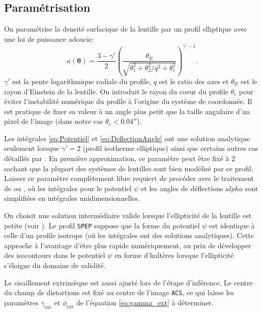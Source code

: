 \documentclass[times,10pt,twocolumn]{article}
\begin{document}
\subsection{Paramétrisation}
On paramétrise la densité surfacique de la lentille par un profil elliptique avec une loi 
de puissance adoucie:
\begin{equation}\label{eq:Kappa} 
        \kappa(\boldsymbol{\theta}) = \frac{3 - \gamma'}{2} 
        \left( 
                \frac{\theta_E}{\sqrt{\theta_1^2 + \theta_2^2/q^2 + \theta_c^2}}
\right)^{\gamma'- 1}. 
\end{equation} 
$\gamma'$ est la pente logarithmique radiale du profile, $q$ est le ratio des axes 
et $\theta_E$ est le rayon d'Einstein de la lentille. On introduit le rayon du coeur du profile 
$\theta_c$ pour éviter l'instabilité numérique du profile à l'origine du système de coordonnée. 
Il est pratique de fixer sa valeur à un angle plus petit que la taille angulaire d'un 
pixel de l'image (dans notre cas $\theta_c < 0.04''$). \par


Les intégrales \eqref{eq:Potentiel} et \eqref{eq:DeflectionAngle} ont une solution analytique 
seulement lorsque $\gamma'= 2$ (profil isotherme elliptique) ainsi que certains autres cas 
détaillés par \citet{Keeton2001}. En première approximation, ce paramètre peut être fixé 
à $2$ sachant que la plupart des systèmes de lentilles sont bien modélisé par ce profil. 
Laisser ce paramètre complètement libre requiert de procéder avec le traitement de 
\citet{Barkana1998} ou \citet{Tessore2015}, où les intégrales pour le potentiel $\psi$ 
et les angles de déflections $alpha$ 
sont simplifiées en intégrales unidimensionnelles. \par

On choisit une solution intermédiaire valide lorsque l'ellipticité de la lentille est 
petite (voir \citet{Barkana1998}). Le profil \texttt{SPEP} suppose que la forme 
du potentiel $\psi$ est identique à celle d'un profile isotrope (où 
les intégrales ont des solutions analytiques). Cette approche à l'avantage d'être plus 
rapide numériquement, au prix de développer des isocontours dans le potentiel $\psi$
en forme d'haltères lorsque 
l'ellipticité s'éloigne du domaine de validité.

Le cisaillement extrinsèque est aussi ajusté lors de l'étape d'inférence. Le centre 
du champ de distortions est fixé au centre de l'image \texttt{ACS}, ce qui laisse 
les paramètres $\gamma_{\mathrm{ext}}$ et $\phi_{\mathrm{ext}}$ de l'équation 
\eqref{eq:gamma_ext} à déterminer.
\end{document}
